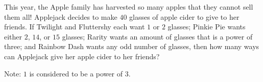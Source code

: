 This year, the Apple family has harvested so many apples that they cannot sell them all! Applejack decides to make $40$ glasses of apple cider to give to her friends. If Twilight and Fluttershy each want $1$ or $2$ glasses; Pinkie Pie wants either $2$, $14$, or $15$ glasses; Rarity wants an amount of glasses that is a power of three; and Rainbow Dash wants any odd number of glasses, then how many ways can Applejack give her apple cider to her friends?

Note: $1$ is considered to be a power of $3$.
